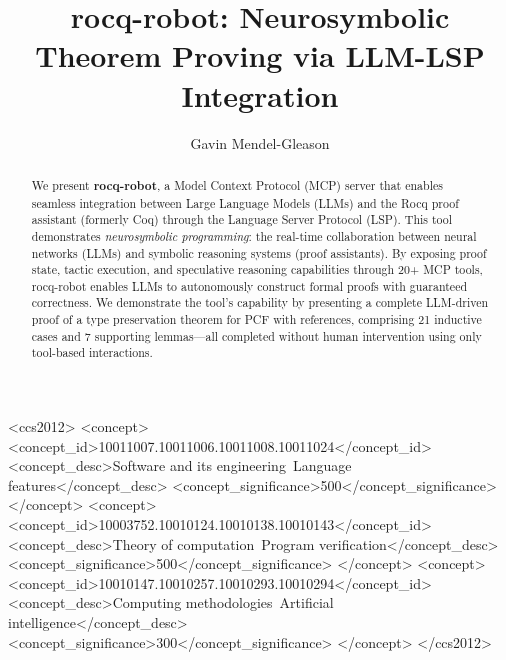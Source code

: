 \documentclass[sigconf,screen,nonacm]{acmart}
\begin{document}
\title{rocq-robot: Neurosymbolic Theorem Proving via LLM-LSP Integration}

\author{Gavin Mendel-Gleason}

\begin{abstract}
We present \textbf{rocq-robot}, a Model Context Protocol (MCP) server that enables seamless integration between Large Language Models (LLMs) and the Rocq proof assistant (formerly Coq) through the Language Server Protocol (LSP). This tool demonstrates \emph{neurosymbolic programming}: the real-time collaboration between neural networks (LLMs) and symbolic reasoning systems (proof assistants). By exposing proof state, tactic execution, and speculative reasoning capabilities through 20+ MCP tools, rocq-robot enables LLMs to autonomously construct formal proofs with guaranteed correctness. We demonstrate the tool's capability by presenting a complete LLM-driven proof of a type preservation theorem for PCF with references, comprising 21 inductive cases and 7 supporting lemmas—all completed without human intervention using only tool-based interactions.
\end{abstract}

\begin{CCSXML}
<ccs2012>
<concept>
<concept_id>10011007.10011006.10011008.10011024</concept_id>
<concept_desc>Software and its engineering~Language features</concept_desc>
<concept_significance>500</concept_significance>
</concept>
<concept>
<concept_id>10003752.10010124.10010138.10010143</concept_id>
<concept_desc>Theory of computation~Program verification</concept_desc>
<concept_significance>500</concept_significance>
</concept>
<concept>
<concept_id>10010147.10010257.10010293.10010294</concept_id>
<concept_desc>Computing methodologies~Artificial intelligence</concept_desc>
<concept_significance>300</concept_significance>
</concept>
</ccs2012>
\end{CCSXML}



\maketitle
\end{document}
